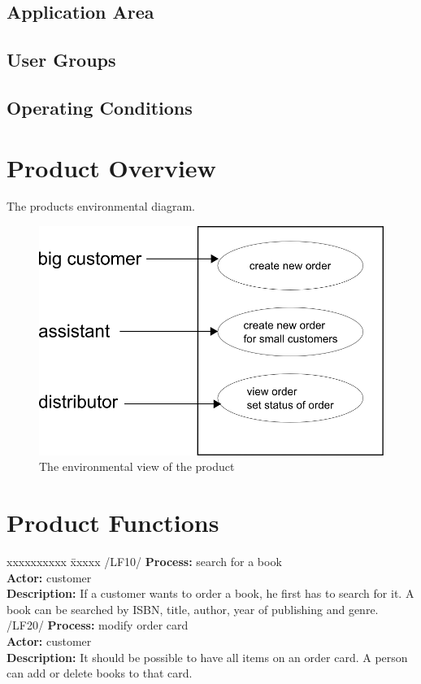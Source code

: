 \documentclass[11pt,a4paper,oneside,svgnames,draft]{report}
\begin{document}
\section{Application Area}
\section{User Groups}
\section{Operating Conditions}

\chapter{Product Overview}
The products environmental diagram.

\begin{figure}[h!]
 \begin{center}
  \includegraphics[scale=0.8]{images/umweltdiagramm.png}
 \end{center}
 \caption{The environmental view of the product}
\end{figure}


\chapter{Product Functions}
\begin{tabbing}
    xxxxxxxxxx \= xxxxx \kill
    /LF10/ \> \textbf{Process:} search for a book\\
	\> \textbf{Actor:} customer\\ 
	\>\textbf{Description:} If a customer wants to order a book, he first has to search for it. A book can be searched by ISBN, title, author, year of publishing and genre.\\
	
	/LF20/ \> \textbf{Process:} modify order card\\
	\> \textbf{Actor:} customer\\ 
	\>\textbf{Description:} It should be possible to have all items on an order card. A person can add or delete books to that card.\\
\end{tabbing}
\end{document}
